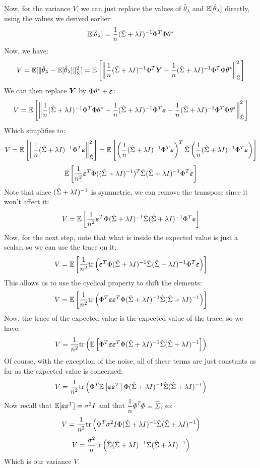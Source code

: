 \documentclass[12pt]{article}
\begin{document}
Now, for the variance $V$,
we can just replace the values
of $\hat{\theta}_\lambda$
and $\mathbb{E}[\hat{\theta}_\lambda]$ directly,
using the values we derived earlier:
\[ \mathbb{E}[\hat{\theta}_\lambda]
= \dfrac{1}{n}(\hat{\Sigma} 
+ \lambda I)^{-1} \Phi^T \Phi \theta^* \]
Now, we have:
\[ V = \mathbb{E}[\|\hat{\theta}_\lambda 
- \mathbb{E}[\hat{\theta}_\lambda] \|^2_{\hat{\Sigma}}]
= \mathbb{E}\left[ \left\| \dfrac{1}{n}(\hat{\Sigma} + \lambda I)^{-1}
\Phi^T \boldsymbol{Y}
- \dfrac{1}{n}(\hat{\Sigma} + \lambda I)^{-1} 
\Phi^T \Phi \theta^*  \right\|^2_{\hat{\Sigma}} \right] \]
We can then replace $\boldsymbol{Y}$ by 
$\Phi \theta^* + \boldsymbol{\varepsilon}$:
\[ V = \mathbb{E}\left[ \left\| \dfrac{1}{n}
(\hat{\Sigma} + \lambda I)^{-1} \Phi^T \Phi \theta^*
+ \dfrac{1}{n}
(\hat{\Sigma} + \lambda I)^{-1} \Phi^T \boldsymbol{\varepsilon}
- \dfrac{1}{n}(\hat{\Sigma} + \lambda I)^{-1} 
\Phi^T \Phi \theta^*  \right\|^2_{\hat{\Sigma}} \right] \]
Which simplifies to:
\[ V = \mathbb{E}\left[ \left\|  \dfrac{1}{n}
(\hat{\Sigma} + \lambda I)^{-1} \Phi^T \boldsymbol{\varepsilon} 
 \right\|^2_{\hat{\Sigma}} \right]
= \mathbb{E}\left[ \left( \dfrac{1}{n}
(\hat{\Sigma} + \lambda I)^{-1} \Phi^T \boldsymbol{\varepsilon} \right)^T
\hat{\Sigma} \left( \dfrac{1}{n}
(\hat{\Sigma} + \lambda I)^{-1} \Phi^T \boldsymbol{\varepsilon} \right) \right] \]
\[ \mathbb{E}\left[  \dfrac{1}{n^2} \boldsymbol{\varepsilon}^T \Phi 
((\hat{\Sigma} + \lambda I)^{-1})^T
\hat{\Sigma}(\hat{\Sigma} + \lambda I)^{-1} 
\Phi^T \boldsymbol{\varepsilon} \right] \]
Note that since $(\hat{\Sigma} + \lambda I)^{-1}$
is symmetric, we can remove the transpose since
it won't affect it:
\[ V = \mathbb{E}\left[  \dfrac{1}{n^2} \boldsymbol{\varepsilon}^T \Phi 
(\hat{\Sigma} + \lambda I)^{-1}
\hat{\Sigma}(\hat{\Sigma} + \lambda I)^{-1} 
\Phi^T \boldsymbol{\varepsilon} \right] \]
Now, for the next step,
note that what is inside the expected value is
just a scalar, so we can use the trace on it:
\[ V = \mathbb{E}\left[  \dfrac{1}{n^2} \text{tr}\left( \boldsymbol{\varepsilon}^T 
\Phi (\hat{\Sigma} + \lambda I)^{-1}
\hat{\Sigma}(\hat{\Sigma} + \lambda I)^{-1} 
\Phi^T \boldsymbol{\varepsilon} \right) \right] \]
This allows us to use the cyclical property
to shift the elements:
\[ V = \mathbb{E}\left[  \dfrac{1}{n^2} \text{tr}\left(  \Phi^T \boldsymbol{\varepsilon} 
\boldsymbol{\varepsilon}^T \Phi (\hat{\Sigma} + \lambda I)^{-1}
\hat{\Sigma}(\hat{\Sigma} + \lambda I)^{-1}  \right) \right] \]
Now, the trace of the expected value is the expected
value of the trace, so we have:
\[ V = \dfrac{1}{n^2} \text{tr}\left(  \mathbb{E}\left[  \Phi^T \boldsymbol{\varepsilon} 
\boldsymbol{\varepsilon}^T \Phi (\hat{\Sigma} + \lambda I)^{-1}
\hat{\Sigma}(\hat{\Sigma} + \lambda I)^{-1}  \right] \right) \]
Of course, with the exception of the noise,
all of these terms are just constants as far 
as the expected value is concerned:
\[ V = \dfrac{1}{n^2} \text{tr}\left(  \Phi^T \mathbb{E}\left[  \boldsymbol{\varepsilon} 
\boldsymbol{\varepsilon}^T  \right] \Phi (\hat{\Sigma} + \lambda I)^{-1}
\hat{\Sigma}(\hat{\Sigma} + \lambda I)^{-1}  \right) \]
Now recall that $\mathbb{E}[\boldsymbol{\varepsilon} \boldsymbol{\varepsilon}^T] = \sigma^2 I$
and that $\dfrac{1}{n}\Phi^T\Phi = \hat{\Sigma}$, so:
\[ V = \dfrac{1}{n^2} \text{tr}\left(  \Phi^T  \sigma^2 I \Phi (\hat{\Sigma} + \lambda I)^{-1}
\hat{\Sigma}(\hat{\Sigma} + \lambda I)^{-1}  \right) \]
\[ V = \dfrac{\sigma^2}{n}
\text{tr}\left(  \hat{\Sigma} (\hat{\Sigma} + \lambda I)^{-1}
\hat{\Sigma}(\hat{\Sigma} + \lambda I)^{-1}  \right) \]
Which is our variance $V$. \\
\end{document}

